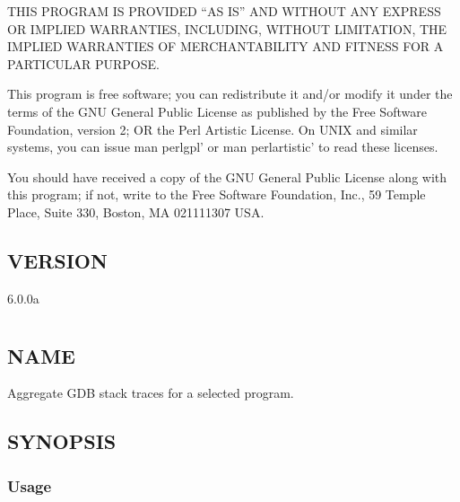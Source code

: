\documentclass[letterpaper,10pt,english]{sphinxmanual}
\begin{document}
THIS PROGRAM IS PROVIDED “AS IS” AND WITHOUT ANY EXPRESS OR IMPLIED
WARRANTIES, INCLUDING, WITHOUT LIMITATION, THE IMPLIED WARRANTIES OF
MERCHANTABILITY AND FITNESS FOR A PARTICULAR PURPOSE.

This program is free software; you can redistribute it and/or modify it under
the terms of the GNU General Public License as published by the Free Software
Foundation, version 2; OR the Perl Artistic License.  On UNIX and similar
systems, you can issue \textasciigrave{}man perlgpl’ or \textasciigrave{}man perlartistic’ to read these
licenses.

You should have received a copy of the GNU General Public License along with
this program; if not, write to the Free Software Foundation, Inc., 59 Temple
Place, Suite 330, Boston, MA  02111\sphinxhyphen{}1307  USA.


\section{VERSION}
\label{\detokenize{mariadb-schema-change:version}}
 6.0.0a


\chapter{}
\label{\detokenize{mariadb-stacktrace:mariadb-stacktrace}}\label{\detokenize{mariadb-stacktrace::doc}}

\section{NAME}
\label{\detokenize{mariadb-stacktrace:name}}
 \sphinxhyphen{} Aggregate GDB stack traces for a selected program.


\section{SYNOPSIS}
\label{\detokenize{mariadb-stacktrace:synopsis}}

\subsection{Usage}
\label{\detokenize{mariadb-stacktrace:usage}}
\begin{sphinxVerbatim}[commandchars=\\\{\}]
 \PYG{p}{[}\PYG{p}{]} \PYG{p}{[}\PYG{p}{]}
\end{sphinxVerbatim}
\end{document}
